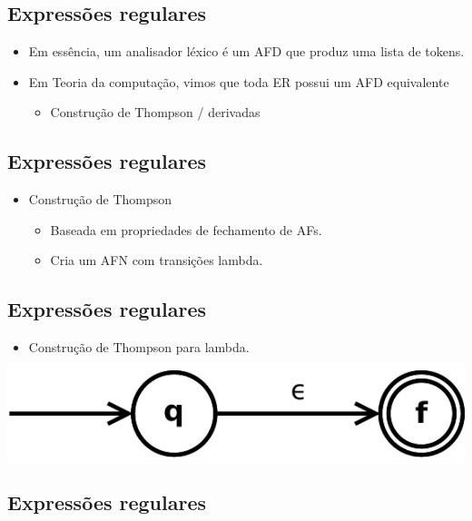 \documentclass[11pt]{article}
\begin{document}
\subsection*{Expressões regulares}
\label{sec:org392ef48}

\begin{itemize}
\item Em essência, um analisador léxico é um AFD que produz
uma lista de tokens.
\item Em Teoria da computação, vimos que toda ER possui um AFD
equivalente
\begin{itemize}
\item Construção de Thompson / derivadas
\end{itemize}
\end{itemize}
\subsection*{Expressões regulares}
\label{sec:org5c45d86}

\begin{itemize}
\item Construção de Thompson
\begin{itemize}
\item Baseada em propriedades de fechamento de AFs.
\item Cria um AFN com transições lambda.
\end{itemize}
\end{itemize}
\subsection*{Expressões regulares}
\label{sec:org0ac13a4}

\begin{itemize}
\item Construção de Thompson para lambda.
\end{itemize}

\begin{center}
\includegraphics[width=.9\linewidth]{./Thompson-epsilon.png}
\end{center}
\subsection*{Expressões regulares}
\label{sec:org62a6674}
\end{document}
